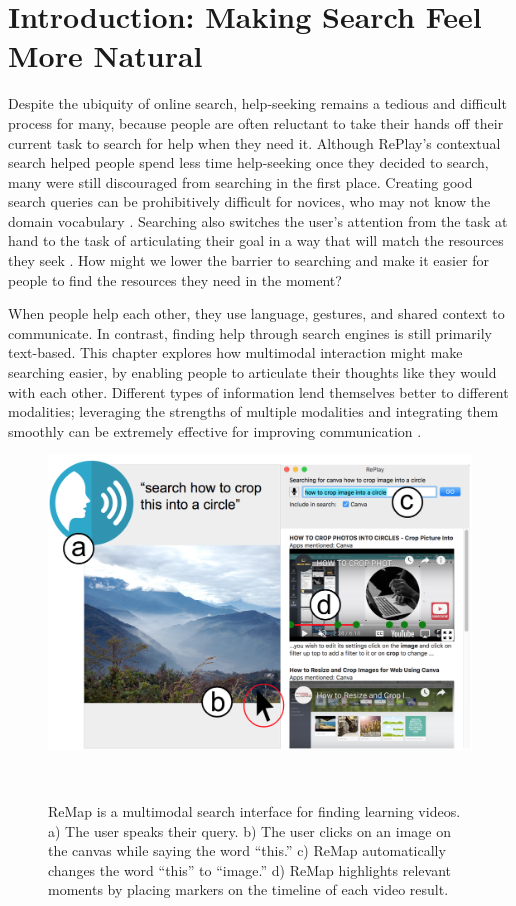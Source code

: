 \section{Introduction: Making Search Feel More Natural}
Despite the ubiquity of online search, help-seeking remains a tedious and difficult process for many, because people are often reluctant to take their hands off their current task to search for help when they need it. Although RePlay's contextual search helped people spend less time help-seeking once they decided to search, many were still discouraged from searching in the first place. Creating good search queries can be prohibitively difficult for novices, who may not know the domain vocabulary \cite{Russell2011}. Searching also switches the user's attention from the task at hand to the task of articulating their goal in a way that will match the resources they seek \cite{Tuovinen1999}. How might we lower the barrier to searching and make it easier for people to find the resources they need in the moment?

When people help each other, they use language, gestures, and shared context to communicate. In contrast, finding help through search engines is still primarily text-based. This chapter explores how multimodal interaction might make searching easier, by enabling people to articulate their thoughts like they would with each other. Different types of information lend themselves better to different modalities; leveraging the strengths of multiple modalities and integrating them smoothly can be extremely effective for improving communication \cite{Oviatt1999}. 

\begin{figure}[b!]
\centering
  \includegraphics[width=.7\textwidth]{remap/figures/interface.png}
  \caption[ReMap is a multimodal search interface for finding learning videos.]{ReMap is a multimodal search interface for finding learning videos. a) The user speaks their query. b) The user clicks on an image on the canvas while saying the word ``this.'' c) ReMap automatically changes the word ``this'' to ``image.'' d) ReMap highlights relevant moments by placing markers on the timeline of each video result.}~\label{fig:remap_interface}
\end{figure}

